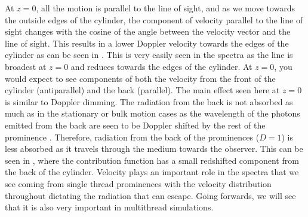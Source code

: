 At $z=0$, all the motion is parallel to the line of sight, and as we move towards the outside edges of the cylinder, the component of velocity parallel to the line of sight changes with the cosine of the angle between the velocity vector and the line of sight. This results in a lower Doppler velocity towards the edges of the cylinder as can be seen in . This is very easily seen in the spectra as the line is broadest at $z=0$ and reduces towards the edges of the cylinder. At $z=0$, you would expect to see components of both the velocity from the front of the cylinder (antiparallel) and the back (parallel). The main effect seen here at $z=0$ is similar to Doppler dimming. The radiation from the back is not absorbed as much as in the stationary or bulk motion cases as the wavelength of the photons emitted from the back are seen to be Doppler shifted by the rest of the prominence . Therefore, radiation from the back of the prominences ($D=1$) is less absorbed as it travels through the medium towards the observer. This can be seen in , where the contribution function has a small redshifted component from the back of the cylinder. Velocity plays an important role in the spectra that we see coming from single thread prominences with the velocity distribution throughout dictating the radiation that can escape. Going forwards, we will see that it is also very important in multithread simulations.

